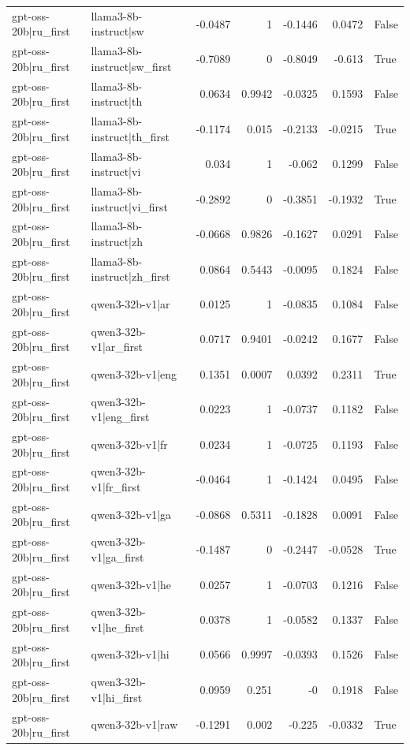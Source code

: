 \begin{table}
\begin{tabular}{l l r r r r l}
gpt-oss-20b|ru_first & llama3-8b-instruct|sw & -0.0487 & 1 & -0.1446 & 0.0472 & False \\
gpt-oss-20b|ru_first & llama3-8b-instruct|sw_first & -0.7089 & 0 & -0.8049 & -0.613 & True \\
gpt-oss-20b|ru_first & llama3-8b-instruct|th & 0.0634 & 0.9942 & -0.0325 & 0.1593 & False \\
gpt-oss-20b|ru_first & llama3-8b-instruct|th_first & -0.1174 & 0.015 & -0.2133 & -0.0215 & True \\
gpt-oss-20b|ru_first & llama3-8b-instruct|vi & 0.034 & 1 & -0.062 & 0.1299 & False \\
gpt-oss-20b|ru_first & llama3-8b-instruct|vi_first & -0.2892 & 0 & -0.3851 & -0.1932 & True \\
gpt-oss-20b|ru_first & llama3-8b-instruct|zh & -0.0668 & 0.9826 & -0.1627 & 0.0291 & False \\
gpt-oss-20b|ru_first & llama3-8b-instruct|zh_first & 0.0864 & 0.5443 & -0.0095 & 0.1824 & False \\
gpt-oss-20b|ru_first & qwen3-32b-v1|ar & 0.0125 & 1 & -0.0835 & 0.1084 & False \\
gpt-oss-20b|ru_first & qwen3-32b-v1|ar_first & 0.0717 & 0.9401 & -0.0242 & 0.1677 & False \\
gpt-oss-20b|ru_first & qwen3-32b-v1|eng & 0.1351 & 0.0007 & 0.0392 & 0.2311 & True \\
gpt-oss-20b|ru_first & qwen3-32b-v1|eng_first & 0.0223 & 1 & -0.0737 & 0.1182 & False \\
gpt-oss-20b|ru_first & qwen3-32b-v1|fr & 0.0234 & 1 & -0.0725 & 0.1193 & False \\
gpt-oss-20b|ru_first & qwen3-32b-v1|fr_first & -0.0464 & 1 & -0.1424 & 0.0495 & False \\
gpt-oss-20b|ru_first & qwen3-32b-v1|ga & -0.0868 & 0.5311 & -0.1828 & 0.0091 & False \\
gpt-oss-20b|ru_first & qwen3-32b-v1|ga_first & -0.1487 & 0 & -0.2447 & -0.0528 & True \\
gpt-oss-20b|ru_first & qwen3-32b-v1|he & 0.0257 & 1 & -0.0703 & 0.1216 & False \\
gpt-oss-20b|ru_first & qwen3-32b-v1|he_first & 0.0378 & 1 & -0.0582 & 0.1337 & False \\
gpt-oss-20b|ru_first & qwen3-32b-v1|hi & 0.0566 & 0.9997 & -0.0393 & 0.1526 & False \\
gpt-oss-20b|ru_first & qwen3-32b-v1|hi_first & 0.0959 & 0.251 & -0 & 0.1918 & False \\
gpt-oss-20b|ru_first & qwen3-32b-v1|raw & -0.1291 & 0.002 & -0.225 & -0.0332 & True \\

\end{tabular}
\end{table}

